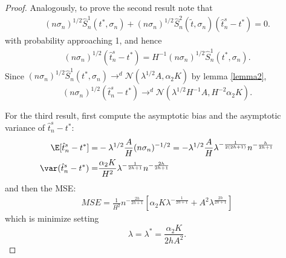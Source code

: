 {\begin{proof}
    Analogously, to prove the second result note that
    \begin{gather}
        (n\sigma_n)^{1/2} \hat{S}^1_n(t^*,\sigma_n) + (n\sigma_n)^{1/2} \hat{S}^2_n(\tilde{t},\sigma_n) (\hat{t}^s_n - t^*) = 0.
    \end{gather}
    with probability approaching 1, and hence
    \begin{gather}
        (n\sigma_n)^{1/2} (\hat{t}^s_n - t^*) = H^{-1} (n\sigma_n)^{1/2} \hat{S}^1_n(t^*,\sigma_n).
    \end{gather}
    Since $(n\sigma_n)^{1/2} \hat{S}^1_n(t^*,\sigma_n) \rightarrow^d \mathcal{N}(\lambda^{1/2}A,\alpha_2 K)$ by lemma \ref{lemma2}, $$(n\sigma_n)^{1/2}(\hat{t}^s_n - t^*) \rightarrow^d \mathcal{N}(\lambda^{1/2}H^{-1}A, H^{-2}\alpha_2 K).$$

    For the third result, first compute the asymptotic bias and the asymptotic variance of $\hat{t}^s_n - t^*$:
    \begin{align}
        \E[\hat{t}^s_n - t^*] =& -\lambda^{1/2}\frac{A}{H}(n\sigma_n)^{-1/2} =-\lambda^{1/2}\frac{A}{H} \lambda^{-\frac{1}{2(2h+1)}} n^{-\frac{h}{2h+1}} \\
        \var(\hat{t}^s_n - t^*) =& \frac{\alpha_2 K}{H^2} \lambda^{-\frac{1}{2h+1}} n^{-\frac{2h}{2h+1}} 
    \end{align}
    and then the MSE:
    \begin{gather}
        MSE = \frac{1}{H^2} n^{-\frac{2h}{2h+1}} \left[ \alpha_2 K \lambda^{-\frac{1}{2h+1}} + A^2 \lambda^{\frac{2h}{2h+1}} \right]
    \end{gather}
    which is minimize setting $$\lambda = \lambda^* = \frac{\alpha_2 K}{2hA^2 }.$$
\end{proof}


}
